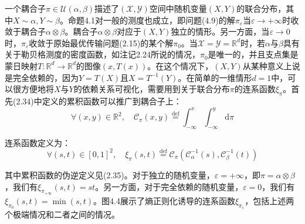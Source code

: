 \documentclass[cn,10pt,math=newtx,citestyle=gb7714-2015,bibstyle=gb7714-2015]{elegantbook}
\begin{document}
\begin{postulate}[独立性与耦合子]
一个耦合子$\pi\in\mathcal{U}(\alpha,\beta)$描述了$(\mathcal{X,Y})$空间中随机变量$(X,Y)$的联合分布，其中$X\sim \alpha,Y\sim \beta$。命题4.1对一般的测度也成立，即问题(4.9)的解$\pi_\varepsilon$当$\varepsilon\to+\infty$时收敛于耦合子$\alpha \otimes \beta$。耦合子$\alpha\otimes \beta$对应于$(X,Y)$独立的情形。另一方面，当$\varepsilon\to 0$时，$\pi_\varepsilon$收敛于原始最优传输问题(2.15)的某个解$\pi_0$。当$\mathcal{X}=\mathcal{Y}=\mathbb{R}^d$时，若$\alpha$与$\beta$具有关于勒贝格测度的密度函数，如注记2.24所说的情况，$\pi_0$是唯一的，并且支点集是蒙日映射$T:\mathbb{R}^d\to\mathbb{R}^d$的图像$(x,T(x))$。在这个情况下，$(X,Y)$从某种意义上说是完全依赖的，因为$Y=T(X)$且$X=T^{-1}(Y)$。在简单的一维情形$d=1$中，可以很方便地将$X$与$Y$的依赖关系可视化，需要用到关于联合分布$\pi$的连系函数$\xi_\pi$。首先(2.34)中定义的累积函数可以推广到耦合子上：
\begin{equation*}
    \forall (x,y)\in \mathbb{R}^2, \quad \mathcal{C}_\pi(x,y) \overset{\text{def}}{=} \int_{-\infty}^x\int_{-\infty}^y \text{d}\pi
\end{equation*}

连系函数定义为：
\begin{equation*}
    \forall (s,t)\in [0,1]^2, \quad \xi_\pi(s,t) \overset{\text{def}}{=} \mathcal{C}_\pi(\mathcal{C}_\alpha^{-1}(s),\mathcal{C}_{\beta}^{-1}(t))
\end{equation*}

其中累积函数的伪逆定义见(2.35)。对于独立的随机变量，$\varepsilon=+\infty$，即$\pi=\alpha\otimes \beta$，我们有$\xi_{\pi_{+\infty}}(s,t)=st$。另一方面，对于完全依赖的随机变量，$\varepsilon=0$，我们有$\xi_{\pi_0}(s,t)=\min(s,t)$。图4.4展示了熵正则化诱导的连系函数$\xi_{\pi_\varepsilon}$，包括上述两个极端情况和二者之间的情况。
\end{postulate}
\end{document}
